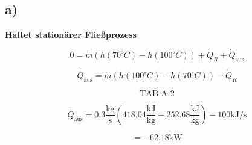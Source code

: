 

\subsection*{a)}
\textbf{Haltet stationärer Fließprozess}

\[
0 = \dot{m} \left( h(70^\circ C) - h(100^\circ C) \right) + \dot{Q}_R + \dot{Q}_{\text{aus}}
\]

\[
\dot{Q}_{\text{aus}} = \dot{m} \left( h(100^\circ C) - h(70^\circ C) \right) - \dot{Q}_R
\]

\[
\text{TAB A-2}
\]

\[
\dot{Q}_{\text{aus}} = 0.3 \frac{\text{kg}}{\text{s}} \left( 418.04 \frac{\text{kJ}}{\text{kg}} - 252.68 \frac{\text{kJ}}{\text{kg}} \right) - 100 \text{kJ/s}
\]

\[
= -62.18 \text{kW}
\]